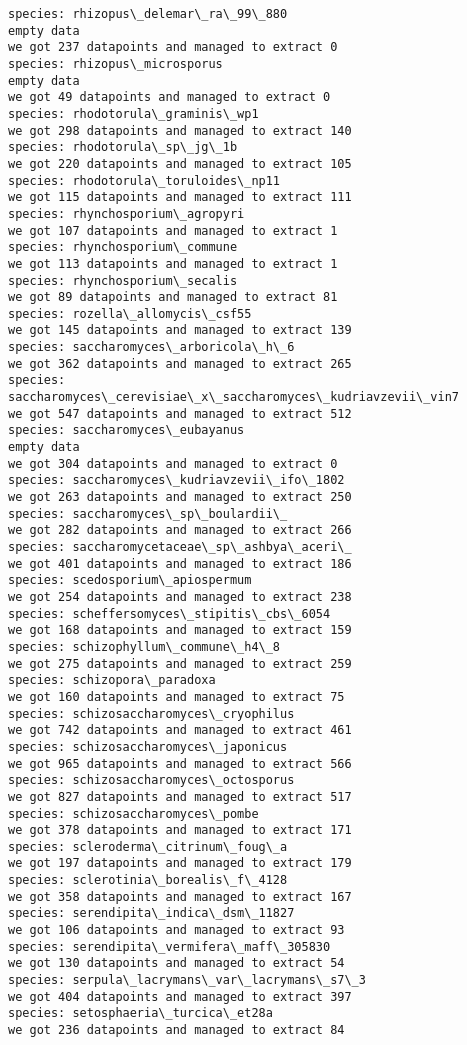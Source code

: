 \documentclass[11pt]{article}
\begin{document}
\begin{Verbatim}[commandchars=\\\{\}]
species: rhizopus\_delemar\_ra\_99\_880
empty data
we got 237 datapoints and managed to extract 0
species: rhizopus\_microsporus
empty data
we got 49 datapoints and managed to extract 0
species: rhodotorula\_graminis\_wp1
we got 298 datapoints and managed to extract 140
species: rhodotorula\_sp\_jg\_1b
we got 220 datapoints and managed to extract 105
species: rhodotorula\_toruloides\_np11
we got 115 datapoints and managed to extract 111
species: rhynchosporium\_agropyri
we got 107 datapoints and managed to extract 1
species: rhynchosporium\_commune
we got 113 datapoints and managed to extract 1
species: rhynchosporium\_secalis
we got 89 datapoints and managed to extract 81
species: rozella\_allomycis\_csf55
we got 145 datapoints and managed to extract 139
species: saccharomyces\_arboricola\_h\_6
we got 362 datapoints and managed to extract 265
species: saccharomyces\_cerevisiae\_x\_saccharomyces\_kudriavzevii\_vin7
we got 547 datapoints and managed to extract 512
species: saccharomyces\_eubayanus
empty data
we got 304 datapoints and managed to extract 0
species: saccharomyces\_kudriavzevii\_ifo\_1802
we got 263 datapoints and managed to extract 250
species: saccharomyces\_sp\_boulardii\_
we got 282 datapoints and managed to extract 266
species: saccharomycetaceae\_sp\_ashbya\_aceri\_
we got 401 datapoints and managed to extract 186
species: scedosporium\_apiospermum
we got 254 datapoints and managed to extract 238
species: scheffersomyces\_stipitis\_cbs\_6054
we got 168 datapoints and managed to extract 159
species: schizophyllum\_commune\_h4\_8
we got 275 datapoints and managed to extract 259
species: schizopora\_paradoxa
we got 160 datapoints and managed to extract 75
species: schizosaccharomyces\_cryophilus
we got 742 datapoints and managed to extract 461
species: schizosaccharomyces\_japonicus
we got 965 datapoints and managed to extract 566
species: schizosaccharomyces\_octosporus
we got 827 datapoints and managed to extract 517
species: schizosaccharomyces\_pombe
we got 378 datapoints and managed to extract 171
species: scleroderma\_citrinum\_foug\_a
we got 197 datapoints and managed to extract 179
species: sclerotinia\_borealis\_f\_4128
we got 358 datapoints and managed to extract 167
species: serendipita\_indica\_dsm\_11827
we got 106 datapoints and managed to extract 93
species: serendipita\_vermifera\_maff\_305830
we got 130 datapoints and managed to extract 54
species: serpula\_lacrymans\_var\_lacrymans\_s7\_3
we got 404 datapoints and managed to extract 397
species: setosphaeria\_turcica\_et28a
we got 236 datapoints and managed to extract 84

\end{Verbatim}
\end{document}
